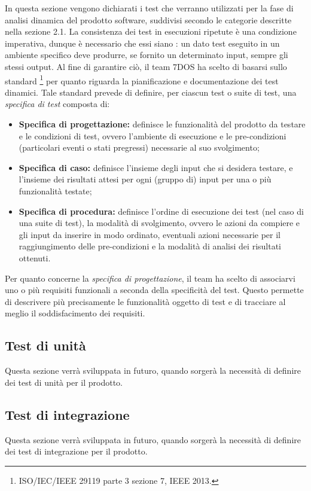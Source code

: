 \pagebreak



In questa sezione vengono dichiarati i test che verranno utilizzati per la fase di analisi dinamica del prodotto software, suddivisi secondo le categorie descritte nella sezione 2.1.
La consistenza dei test in esecuzioni ripetute è una condizione imperativa, dunque è necessario che essi siano : un dato test eseguito in un ambiente specifico deve produrre, se fornito un determinato input, sempre gli stessi output. Al fine di garantire ciò, il team 7DOS ha scelto di basarsi sullo standard \footnote{ISO/IEC/IEEE 29119 parte 3 sezione 7, IEEE 2013.} per quanto riguarda la pianificazione e documentazione dei test dinamici. Tale standard prevede di definire, per ciascun test o suite di test, una \emph{specifica di test} composta di:
\begin{itemize}
	\item {\textbf{Specifica di progettazione:} definisce le funzionalità del prodotto da testare e le condizioni di test, ovvero l'ambiente di esecuzione e le pre-condizioni (particolari eventi o stati pregressi) necessarie al suo svolgimento;}
	\item {\textbf{Specifica di caso:} definisce l'insieme degli input che si desidera testare, e l'insieme dei risultati attesi per ogni (gruppo di) input per una o più funzionalità testate;}
	\item {\textbf{Specifica di procedura:} definisce l'ordine di esecuzione dei test (nel caso di una suite di test), la modalità di svolgimento, ovvero le azioni da compiere e gli input da inserire in modo ordinato, eventuali azioni necessarie per il raggiungimento delle pre-condizioni e la modalità di analisi dei risultati ottenuti.}
\end{itemize}

Per quanto concerne la \emph{specifica di progettazione}, il team ha scelto di associarvi uno o più requisiti funzionali a seconda della specificità del test. Questo permette di descrivere più precisamente le funzionalità oggetto di test e di tracciare al meglio il soddisfacimento dei requisiti.
\subsection{Test di unità}
Questa sezione verrà sviluppata in futuro, quando sorgerà la necessità di definire dei test di unità per il prodotto.
\subsection{Test di integrazione}
Questa sezione verrà sviluppata in futuro, quando sorgerà la necessità di definire dei test di integrazione per il prodotto.
